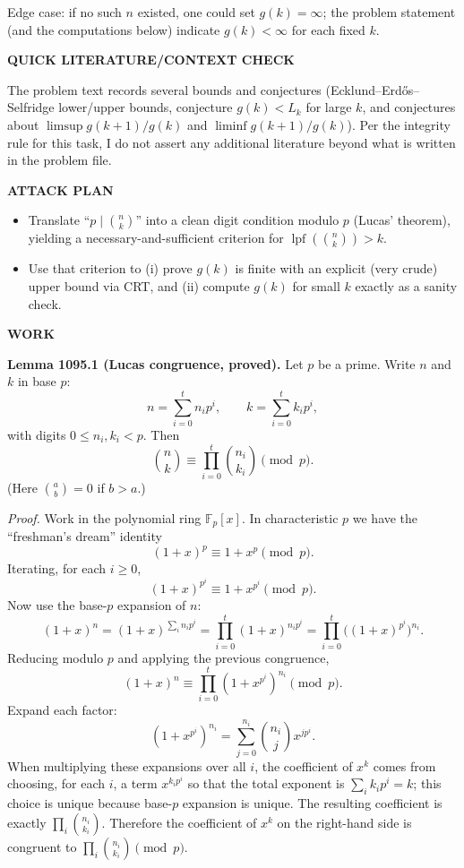 \smallskip
\noindent
Edge case: if no such $n$ existed, one could set $g(k)=\infty$; the problem statement (and the computations below) indicate $g(k)<\infty$ for each fixed $k$.

\medskip
\noindent\textbf{QUICK LITERATURE/CONTEXT CHECK}

\smallskip
\noindent
The problem text records several bounds and conjectures (Ecklund--Erd\H{o}s--Selfridge lower/upper bounds, conjecture $g(k)<L_k$ for large $k$, and conjectures about $\limsup g(k+1)/g(k)$ and $\liminf g(k+1)/g(k)$). Per the integrity rule for this task, I do not assert any additional literature beyond what is written in the problem file.

\medskip
\noindent\textbf{ATTACK PLAN}

\smallskip
\noindent
\begin{itemize}
\item Translate ``$p\mid\binom{n}{k}$'' into a clean digit condition modulo $p$ (Lucas' theorem), yielding a necessary-and-sufficient criterion for $\operatorname{lpf}(\binom{n}{k})>k$.
\item Use that criterion to (i) prove $g(k)$ is finite with an explicit (very crude) upper bound via CRT, and (ii) compute $g(k)$ for small $k$ exactly as a sanity check.
\end{itemize}

\medskip
\noindent\textbf{WORK}

\smallskip
\noindent\textbf{Lemma 1095.1 (Lucas congruence, proved).}
Let $p$ be a prime. Write $n$ and $k$ in base $p$:
\[
 n=\sum_{i=0}^t n_i p^i,\qquad k=\sum_{i=0}^t k_i p^i,
\]
with digits $0\le n_i,k_i<p$. Then
\[
\binom{n}{k}\equiv \prod_{i=0}^t \binom{n_i}{k_i} \pmod p.
\]
(Here $\binom{a}{b}=0$ if $b>a$.)

\smallskip
\noindent\emph{Proof.}
Work in the polynomial ring $\mathbb{F}_p[x]$. In characteristic $p$ we have the ``freshman's dream'' identity
\[
(1+x)^p \equiv 1+x^p \pmod p.
\]
Iterating, for each $i\ge 0$,
\[
(1+x)^{p^i} \equiv 1+x^{p^i} \pmod p.
\]
Now use the base-$p$ expansion of $n$:
\[
(1+x)^n=(1+x)^{\sum_i n_i p^i}=\prod_{i=0}^t (1+x)^{n_i p^i}=\prod_{i=0}^t \bigl((1+x)^{p^i}\bigr)^{n_i}.
\]
Reducing modulo $p$ and applying the previous congruence,
\[
(1+x)^n \equiv \prod_{i=0}^t (1+x^{p^i})^{n_i} \pmod p.
\]
Expand each factor:
\[
(1+x^{p^i})^{n_i}=\sum_{j=0}^{n_i} \binom{n_i}{j} x^{j p^i}.
\]
When multiplying these expansions over all $i$, the coefficient of $x^k$ comes from choosing, for each $i$, a term $x^{k_i p^i}$ so that the total exponent is $\sum_i k_i p^i=k$; this choice is unique because base-$p$ expansion is unique. The resulting coefficient is exactly $\prod_i \binom{n_i}{k_i}$. Therefore the coefficient of $x^k$ on the right-hand side is congruent to $\prod_i \binom{n_i}{k_i}\pmod p$.

